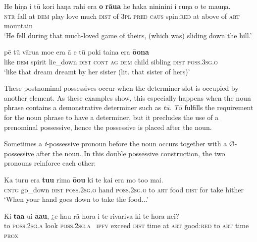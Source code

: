\ea\label{ex:6.12}
\gll He hiŋa {\ꞌ}i tū kori haŋa rahi era \textbf{o} \textbf{rāua} he haka nininini {\ꞌ}i ruŋa  o te ma{\ꞌ}uŋa.\\
\textsc{ntr} fall at \textsc{dem} play love much \textsc{dist} of \textsc{3pl} \textsc{pred} \textsc{caus} spin:\textsc{red} at above  of \textsc{art} mountain\\

\glt 
‘He fell during that much-loved game of theirs, (which was) sliding down the hill.’ \textstyleExampleref{[R313.103]} 
\z

\ea\label{ex:6.13}
\gll pē tū vārua moe era {\ꞌ}ā e tū poki taina era \textbf{ō{\ꞌ}ona} \\
like \textsc{dem} spirit lie\_down \textsc{dist} \textsc{cont} \textsc{ag} \textsc{dem} child sibling \textsc{dist} \textsc{poss.3sg.o} \\

\glt
‘like that dream dreamt by her sister (lit. that sister of hers)’ \textstyleExampleref{[R347.131]} 
\z

These postnominal possessives occur when the determiner slot is occupied by another element. As these examples show, this especially happens when the noun phrase contains a demonstrative determiner such as \textit{tū}. \textit{Tū} fulfills the requirement for the noun phrase to have a determiner, but it precludes the use of a prenominal possessive, hence the possessive is placed after the noun.

Sometimes a \textit{t}-possessive pronoun before the noun occurs together with a Ø-pos\-ses\-sive after the noun. In this double possessive construction, the two pronouns reinforce each other:

\ea\label{ex:6.14}
\gll Ka turu era \textbf{tu{\ꞌ}u} rima \textbf{ō{\ꞌ}ou} ki te kai era mo to{\ꞌ}o mai. \\
\textsc{cntg} go\_down \textsc{dist} \textsc{poss.2sg.o} hand \textsc{poss.2sg.o} to \textsc{art} food \textsc{dist} for take hither \\

\glt 
‘When your hand goes down to take the food...’ \textstyleExampleref{[R310.088]} 
\z

\ea\label{ex:6.15}
\gll Ki \textbf{ta{\ꞌ}a} u{\ꞌ}i \textbf{{\ꞌ}ā{\ꞌ}au}, ¿e hau rā hora {\ꞌ}i te rivariva ki te hora nei? \\
to \textsc{poss.2sg.a} look \textsc{poss.2sg.a} ~\textsc{ipfv} exceed \textsc{dist} time at \textsc{art} good:\textsc{red} to \textsc{art} time \textsc{prox} \\

